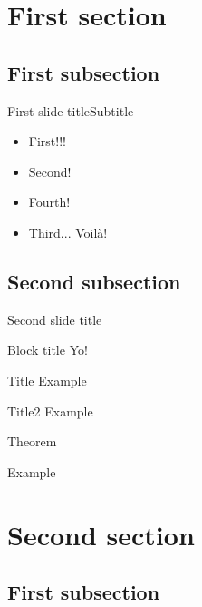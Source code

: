 \section{First section}
\subsection{First subsection}

\begin{frame}{First slide title}{Subtitle}
	\begin{itemize}
		\item {
			First!!!
			\pause
		}
		\item {
			Second!
		}
		\item<4-> {
			Fourth!
		}
		\item<3-> {
			Third... \uncover<5-> {Voil\`{a}!}
		}
	\end{itemize}
\end{frame}

\subsection{Second subsection}

\begin{frame}{Second slide title}
	\begin{block}{Block title}
		Yo!
	\end{block}
	\begin{alertblock}{Title}
	  Example
	\end{alertblock}
	\begin{exampleblock}{Title2}
	  Example
	\end{exampleblock}
	\begin{theorem}
		Theorem
	\end{theorem}
	\begin{example}
		Example
	\end{example}
\end{frame}

\section{Second section}
\subsection{First subsection}

